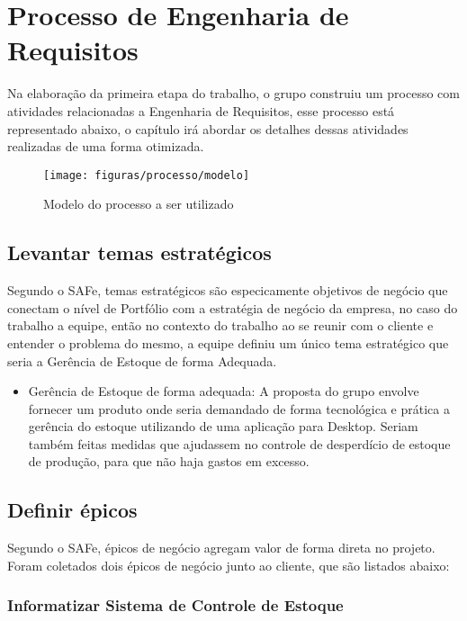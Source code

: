 \chapter{Processo de Engenharia de Requisitos}

Na elaboração da primeira etapa do trabalho, o grupo construiu um processo com atividades relacionadas a Engenharia de Requisitos, esse processo está representado abaixo, o capítulo irá abordar os detalhes dessas atividades realizadas de uma forma otimizada.

\begin{figure}[!htpb]
\centering	
\texttt{[image: figuras/processo/modelo]}
\caption{Modelo do processo a ser utilizado}
\end{figure}

\newpage

\section{Levantar temas estratégicos}

Segundo o SAFe, temas estratégicos são especicamente objetivos de negócio que conectam o nível de Portfólio com a estratégia de negócio da empresa, no caso do trabalho a equipe, então no contexto do trabalho ao se reunir com o cliente e entender o problema do mesmo, a equipe definiu um único tema estratégico que seria a Gerência de Estoque de forma Adequada.

\begin{itemize}
\item Gerência de Estoque de forma adequada: A proposta do grupo envolve fornecer um produto onde seria demandado de forma tecnológica e prática a gerência do estoque utilizando de uma aplicação para Desktop. Seriam também feitas medidas que ajudassem no controle de desperdício de estoque de produção, para que não haja gastos em excesso.
\end{itemize}

\section{Definir épicos}
Segundo o SAFe, épicos de negócio agregam valor de forma direta no projeto. Foram coletados dois épicos de negócio junto ao cliente, que são listados abaixo:


\subsection{Informatizar Sistema de Controle de Estoque}
	

